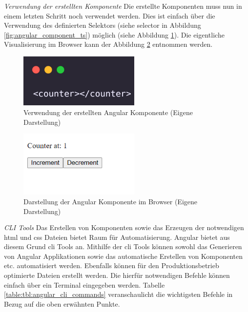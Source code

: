 \textit{Verwendung der erstellten Komponente}
\newline
Die erstellte Komponenten muss nun in einem letzten Schritt noch verwendet werden. Dies ist einfach über die Verwendung des definierten Selektors (siehe selector in  Abbildung \ref{fig:angular_component_ts}) möglich (siehe Abbildung \ref{fig:angular_component_usage}). Die eigentliche Visualisierung im Browser kann der Abbildung \ref{fig:angular_component_browser} entnommen werden.

\begin{figure}[h]
    \includegraphics[width=6cm]{images/angular_component_usage.png}
    \centering
    \caption{Verwendung der erstellten Angular Komponente (Eigene Darstellung)}
    \label{fig:angular_component_usage}
\end{figure}

\begin{figure}[h]
    \includegraphics[width=6cm]{images/angular_component_browser.png}
    \centering
    \caption{Darstellung der Angular Komponente im Browser (Eigene Darstellung)}
    \label{fig:angular_component_browser}
\end{figure}

\textit{CLI Tools}
\newline
Das Erstellen von Komponenten sowie das Erzeugen der notwendigen \gls{html} und \gls{css} Dateien bietet Raum für Automatisierung. Angular bietet aus diesem Grund \gls{cli} Tools an. Mithilfe der \gls{cli} Tools können sowohl das Generieren von Angular Applikationen sowie das automatische Erstellen von Komponenten etc. automatisiert werden. Ebenfalls können für den Produktionsbetrieb optimierte Dateien erstellt werden. Die hierfür notwendigen Befehle können einfach über ein Terminal eingegeben werden. Tabelle \ref{table:tbl:angular_cli_commands} veranschaulicht die wichtigsten Befehle in Bezug auf die oben erwähnten Punkte.

